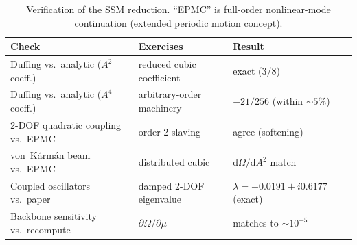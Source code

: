 \documentclass[11pt]{article}
\newcommand{\dd}{\mathrm{d}}
\newcommand{\Om}{\Omega}
\begin{document}
\begin{table}[t]
\centering
\caption{Verification of the SSM reduction. ``EPMC'' is full-order nonlinear-mode
continuation (extended periodic motion concept).}
\label{tab:verify}
\small
\begin{tabular}{@{}lll@{}}
\toprule
Check & Exercises & Result \\ \midrule
Duffing vs.\ analytic ($A^2$ coeff.) & reduced cubic coefficient & exact ($3/8$) \\
Duffing vs.\ analytic ($A^4$ coeff.) & arbitrary-order machinery & $-21/256$ (within $\sim5\%$) \\
2-DOF quadratic coupling vs.\ EPMC & order-2 slaving & agree (softening) \\
von~K\'arm\'an beam vs.\ EPMC & distributed cubic & $\dd\Om/\dd A^2$ match \\
Coupled oscillators vs.\ paper \cite{pozzi2025} & damped 2-DOF eigenvalue & $\lambda=-0.0191\pm i0.6177$ (exact) \\
Backbone sensitivity vs.\ recompute & $\partial\Om/\partial\mu$ & matches to $\sim\!10^{-5}$ \\
\bottomrule
\end{tabular}
\end{table}
\end{document}
